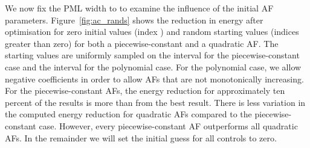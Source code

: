 \documentclass[a4paper]{article}
\begin{document}
We now fix the PML width to  to examine the influence of
the initial AF parameters. Figure~\ref{fig:ac_rands} shows the
reduction in energy after optimisation for zero initial values (index
) and random starting values (indices greater than zero) for both a
piecewise-constant and a quadratic AF.  The starting values are
uniformly sampled on the interval  for the
piecewise-constant case and the interval  for the
polynomial case. For the polynomial case, we allow negative
coefficients in order to allow AFs that are not monotonically
increasing. For the piecewise-constant AFs, the energy reduction for
approximately ten percent of the results is more than 
from the best result.  There is less variation in the computed energy
reduction for quadratic AFs compared to the piecewise-constant
case. However, every piecewise-constant AF outperforms all quadratic
AFs. In the remainder we will set the initial guess for all controls
to zero.
\end{document}

